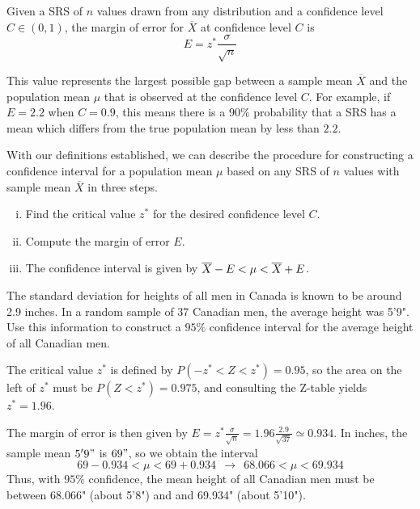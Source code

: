 \begin{defn} Given a SRS of $n$ values drawn from any distribution and a confidence level $C \in (0,1)$, the margin of error for $\overline{X}$ at confidence level $C$ is 
$$E = z^* \frac{\sigma}{\sqrt{n}}$$
\end{defn}
\par
This value represents the largest possible gap between a sample mean $\overline{X}$ and the population mean $\mu$ that is observed at the confidence level $C$. For example, if $E = 2.2$ when $C = 0.9$, this means there is a $90\%$ probability that a SRS has a mean which differs from the true population mean by less than $2.2$.
\par
With our definitions established, we can describe the procedure for constructing a confidence interval for a population mean $\mu$ based on any SRS of $n$ values with sample mean $\overline{X}$ in three steps.
\begin{enumerate}[(i)]
\item Find the critical value $z^*$ for the desired confidence level $C$.
\item Compute the margin of error $E$.
\vspace*{-0.02in}
\item The confidence interval is given by ${\overline{X}} - E < \mu < {\overline{X}} + E$.
\end{enumerate}
\begin{example} 
The standard deviation for heights of all men in Canada is known to be around 2.9 inches. In a random sample of 37 Canadian men, the average height was 5'9". Use this information to construct a $95\%$ confidence interval for the average height of all Canadian men.
\par
\noindent The critical value $z^*$ is defined by $P(-z^* < Z < z^*) = 0.95$, so the area on the left of $z^*$ must be $P(Z < z^*) = 0.975$, and consulting the Z-table yields $z^* = 1.96$.
\begin{center}
\end{center}
\noindent The margin of error is then given by $E = z^*  \frac{\sigma}{\sqrt{n}} = 1.96  \frac{2.9}{\sqrt{37}} \simeq 0.934$. In inches, the sample mean $5'9"$ is $69"$, so we obtain the interval 
$$69-0.934 < \mu < 69+0.934 \ \ \rightarrow \ \ 68.066 < \mu < 69.934$$
\noindent Thus, with $95\%$ confidence, the mean height of all Canadian men must be between 68.066" (about 5'8") and and 69.934" (about 5'10").
\end{example}
